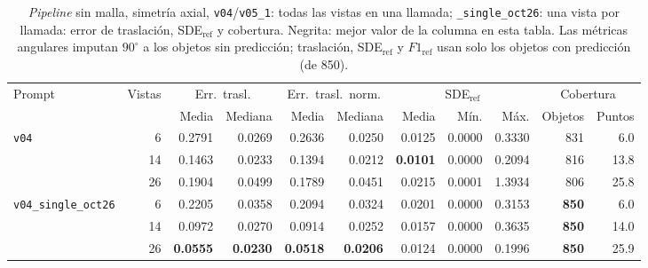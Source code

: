 \begin{table}[htbp]
\centering
\caption{\textit{Pipeline} sin malla, simetría axial, \texttt{v04}/\texttt{v05\_1}: todas las vistas en una llamada; \texttt{\_single\_oct26}: una vista por llamada: error de traslación, SDE$_{\mathrm{ref}}$ y cobertura. Negrita: mejor valor de la columna en esta tabla. Las métricas angulares imputan $90^\circ$ a los objetos sin predicción; traslación, SDE$_{\mathrm{ref}}$ y $F1_{\mathrm{ref}}$ usan solo los objetos con predicción (de 850).}
\label{tab:axis_modo_envio_posicion}
\begin{adjustbox}{max width=\textwidth}
\begin{tabular}{lrrrrrrrrrr}
\toprule
\multirow{2}{*}{Prompt} & \multirow{2}{*}{Vistas} & \multicolumn{2}{c}{Err.\ trasl.} & \multicolumn{2}{c}{Err.\ trasl.\ norm.} & \multicolumn{3}{c}{SDE$_{\mathrm{ref}}$} & \multicolumn{2}{c}{Cobertura} \\
\cmidrule(lr){3-4} \cmidrule(lr){5-6} \cmidrule(lr){7-9} \cmidrule(lr){10-11}
 &  & Media & Mediana & Media & Mediana & Media & Mín. & Máx. & Objetos & Puntos \\
\midrule
\multirow{3}{*}{\texttt{v04}} & 6 & 0.2791 & 0.0269 & 0.2636 & 0.0250 & 0.0125 & 0.0000 & 0.3330 & 831 & 6.0 \\
 & 14 & 0.1463 & 0.0233 & 0.1394 & 0.0212 & \textbf{0.0101} & 0.0000 & 0.2094 & 816 & 13.8 \\
 & 26 & 0.1904 & 0.0499 & 0.1789 & 0.0451 & 0.0215 & 0.0001 & 1.3934 & 806 & 25.8 \\
\midrule
\multirow{3}{*}{\texttt{v04\_single\_oct26}} & 6 & 0.2205 & 0.0358 & 0.2094 & 0.0324 & 0.0201 & 0.0000 & 0.3153 & \textbf{850} & 6.0 \\
 & 14 & 0.0972 & 0.0270 & 0.0914 & 0.0252 & 0.0157 & 0.0000 & 0.3635 & \textbf{850} & 14.0 \\
 & 26 & \textbf{0.0555} & \textbf{0.0230} & \textbf{0.0518} & \textbf{0.0206} & 0.0124 & 0.0000 & 0.1996 & \textbf{850} & 25.9 \\
\bottomrule
\end{tabular}
\end{adjustbox}
\end{table}
